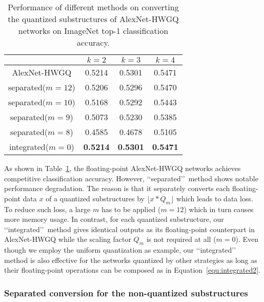 \documentclass[10pt,twocolumn,letterpaper]{article}
\begin{document}
\begin{table}[!h]
\centering
\caption{Performance of different methods on converting the quantized substructures of AlexNet-HWGQ networks on ImageNet top-1 classification accuracy.}
\label{tab:fixdiffbits}
\begin{tabular}{c|c|c|c}

  \hline                               &$k=2$  &$k=3$  &$k=4$ \\
  \hline\hline     {AlexNet-HWGQ}             &0.5214 &0.5301 &0.5471 \\
   \hline          {separated($m=12$)}  &0.5206 &0.5296 &0.5470 \\
                   {separated($m=10$)}  &0.5168 &0.5292 &0.5443 \\
                   {separated($m=9$)}   &0.5073 &0.5230 &0.5385 \\
                   {separated($m=8$)}   &0.4585 &0.4678 &0.5105 \\
   \hline          {integrated($m=0$)} &\textbf{0.5214} &\textbf{0.5301} &\textbf{0.5471} \\
  \hline
\end{tabular}
\end{table}



As shown in Table~\ref{tab:fixdiffbits}, the floating-point AlexNet-HWGQ networks achieves competitive classification accuracy. However, \lq\lq separated\rq\rq\, method shows notable performance degradation. The reason is that it separately converts each floating-point data $x$ of a quantized substructures by $\lfloor x*Q_m \rfloor$ which leads to data loss. To reduce such loss, a large $m$ has to be applied ($m=12$) which in turn causes more memory usage. In contrast, for each quantized substructure, our \lq\lq integrated\rq\rq\, method gives identical outputs as its floating-point counterpart in AlexNet-HWGQ while the scaling factor $Q_m$ is not required at all ($m=0$). Even though we employ the uniform quantization as example, our \lq\lq integrated\rq\rq\, method is also effective for the networks quantized by other strategies as long as their floating-point operations can be composed as in Equation~\ref{equ:integrated2}.


\subsubsection{Separated conversion for the non-quantized substructures} \label{sec:4.1.2}
\end{document}
